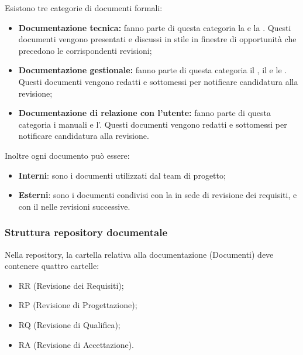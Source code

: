 			Esistono tre categorie di documenti formali:
				\begin{itemize}
					\item \textbf{Documentazione tecnica:} fanno parte di questa categoria la 
					 e la . 
					Questi documenti vengono presentati e discussi in stile  
					in finestre di opportunità che precedono le corrispondenti revisioni;
					\item \textbf{Documentazione gestionale:} fanno parte di questa categoria il \PianoProgetto{}, il \PianoQualifica{} e
					le \NormeProgetto{}. Questi documenti vengono redatti e sottomessi per notificare candidatura alla revisione;
					\item \textbf{Documentazione di relazione con l'utente:} fanno parte di questa categoria i manuali e 											l'\AnalisiRequisiti{}. Questi documenti vengono redatti e sottomessi per notificare candidatura alla revisione.
				\end{itemize}

			Inoltre ogni documento può essere:
                \begin{itemize}
                    \item \textbf{Interni}: sono i documenti utilizzati dal team di progetto;
                    \item \textbf{Esterni}: sono i documenti condivisi con la 
                    in sede di revisione dei requisiti, e con il  nelle
                    revisioni successive.
                \end{itemize}

		\subsubsection{Struttura repository documentale}

			Nella repository, la cartella relativa alla documentazione (Documenti) deve contenere 
			quattro cartelle:

			\begin{itemize}
			    \item RR (Revisione dei Requisiti);
			    \item RP (Revisione di Progettazione);
			    \item RQ (Revisione di Qualifica);
			    \item RA (Revisione di Accettazione).
			\end{itemize}

